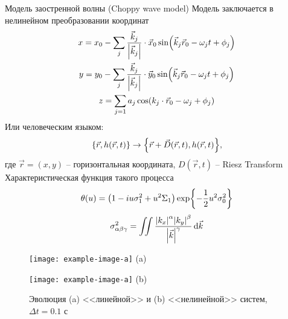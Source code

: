 \begin{frame}[t]{}
\begin{columns}[t]
\begin{column}{.48\linewidth}
\begin{block}{Модель заостренной волны (Choppy wave model)}
            Модель заключается в нелинейном преобразовании координат
            \begin{gather}
                x = x_{0} - \sum\limits_{j} \frac{\vec k_j}{\abs{\vec k_j}} \cdot \vec x_{0} \sin(\vec k_j \vec r_{0} - \omega_j t + \phi_j) \\
                y = y_{0} - \sum\limits_{j} \frac{\vec k_j}{\abs{\vec k_j}} \cdot \vec y_{0} \sin(\vec k_j \vec r_{0} - \omega_j t + \phi_j) \\
                z =  \sum\limits_{j=1} a_j \cos(k_j \cdot \vec r_{0} - \omega_j + \phi_j)
            \end{gather}
            Или человеческим языком:
            \begin{equation}
                \label{eq:}
                \qty{\vec r, h(\vec r,t)} \to \qty{\vec r + \vec D(\vec r,t), h(\vec r,t)},
            \end{equation}
            где $\vec r = (x,y)$ -- горизонтальная координата, $D(\vec r,t)$ -- Riesz Transform
            Характеристическая функция такого процесса
            \begin{equation}
                \label{eq:}
                \theta(u) = \qty(1 - i u \sigma_1^2 + u^2 \Sigma_1) \exp{-\frac{1}{2} u^2 \sigma_0^2}
            \end{equation}
            \begin{equation}
                \label{eq:}
                \sigma^2_{\alpha \beta \gamma} = \iint \frac{ \abs{k_x}^{\alpha} \abs{k_y}^{\beta}}{\abs{\vec k}^{\gamma}} \dd{\vec k}
            \end{equation}
              \begin{figure}[h]
                    \centering
                    \begin{minipage}{0.45\linewidth}
                        \texttt{[image: example-image-a]}
                        \centering 
                        (a)
                    \end{minipage}
                    \begin{minipage}{0.45\linewidth}
                        \texttt{[image: example-image-a]}
                        \centering
                        (b)
                    \end{minipage}
                    \caption{Эволюция (a) <<линейной>>  и (b) <<нелинейной>>  систем, $\Delta t = 0.1 \text{ с}$}
                    \label{fig:}
                \end{figure}



\end{block}
\end{column}
\end{columns}
\end{frame}
